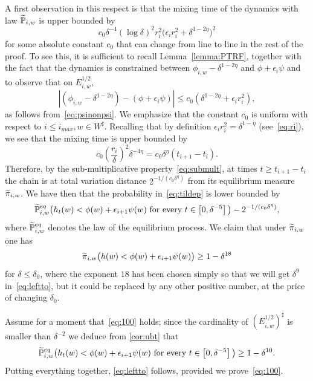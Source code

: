 \documentclass[10pt]{amsart}
\theoremstyle{definition}\newtheorem{defi}[theo]{Definition}\newtheorem{rema}[theo]{Remark}\newtheorem{exam}[theo]{Example}\newtheorem{exem}[theo]{Example}\newtheorem{nota}[theo]{Notation}
\renewcommand{\P}{\mathbb{P}}
\newcommand{\eps}{\epsilon}
\renewcommand{\d}{{\sharp }}
\let\oldtilde\tilde
\renewcommand*{\tilde}[1]{\mathchoice{\widetilde{#1}}{\widetilde{#1}}{\oldtilde{#1}}{\oldtilde{#1}}}
\begin{document}
A first observation in this respect is that the mixing time of the dynamics with law $\tilde\P_{i,w}$ is upper bounded by
\begin{equation}
c_0\delta^{-4}(\log \delta)^2r_i^2\Big(\epsilon_i r_i^2+\delta^{1-2\eta}\Big)^2
\end{equation}
for some absolute constant $c_0$ that can change from line to line in the rest of the proof. To see this, it is sufficient to recall Lemma~\ref{lemma:PTRF}, together with the fact that the dynamics is constrained between $\phi_{i,w}-\delta^{1-2\eta}$ and $ \phi+\epsilon_i\psi$ and to observe that on $E^{1/2}_{i,w}$,
\begin{equation}
\left|\left(\phi_{i,w}-\delta^{1-2\eta}\right)-(\phi+\epsilon_i\psi)\right|\le c_0\left(\delta^{1-2\eta}+\epsilon_i r_i^2\right),
\end{equation}
as follows from~\eqref{eq:psinonpsi}. We emphasize that the constant $c_0$ is uniform with respect to $i\le i_{max},w\in W^\d$. Recalling that by definition $\epsilon_i r_i^2=\delta^{1-\eta}$ (see~\eqref{eq:ri}), we see that the mixing time is upper bounded by
\begin{equation}
c_0\left(\frac{r_i}\delta\right)^2\delta^{-4\eta}=c_0\delta^{\eta}(t_{i+1}-t_i).
\end{equation}
Therefore, by the sub-multiplicative property~\eqref{eq:submult}, at times $t\ge t_{i+1}-t_i$ the chain is at total variation distance $2^{-1/(c_0\delta^{\eta})}$ from its equilibrium measure $\tilde \pi_{i,w}$. We have then that the probability in~\eqref{eq:tildep} is lower bounded by
\begin{equation}
\tilde \P^{eq}_{i,w}\big(h_t(w) < \phi(w) + \eps_{i+1} \psi(w) \text{ for every } t\in \left[0, \delta^{-5}\right]\big)-2^{-1/(c_0\delta^{\eta})},
\end{equation}
where $\tilde \P^{eq}_{i,w}$ denotes the law of the equilibrium process. We claim that under $\tilde\pi_{i,w}$ one has
\begin{equation}\label{eq:100}
\tilde\pi_{i,w}\big(h(w) < \phi(w) + \eps_{i+1} \psi(w)\big)\ge 1-\delta^{18}
\end{equation}
for $\delta\le \delta_0$, where the exponent $18$ has been chosen simply so that we will get $\delta^9$ in~\eqref{eq:leftto}, but it could be replaced by any other positive number, at the price of changing $\delta_0$.

Assume for a moment that~\eqref{eq:100} holds; since the cardinality of $(E^{1/2}_{i,w})^\d$ is smaller than $\delta^{-2}$ we deduce from \cref{cor:ubt} that
\begin{equation}
\tilde \P^{eq}_{i,w}\big(h_t(w) < \phi(w) + \eps_{i+1} \psi(w) \text{ for every } t\in \left[0, \delta^{-5}\right]\big)\ge 1-\delta^{10}.
\end{equation}
Putting everything together, \eqref{eq:leftto} follows, provided we prove~\eqref{eq:100}.
\end{document}
